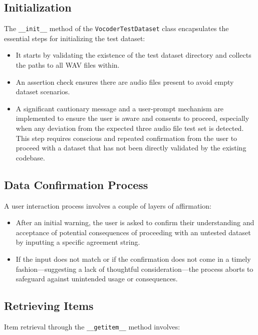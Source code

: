 \documentclass[a4paper]{article}
\begin{document}
\subsection{Initialization}

The \texttt{\_\_init\_\_} method of the \texttt{VocoderTestDataset} class encapsulates the essential steps for initializing the test dataset:

\begin{itemize}
  \item It starts by validating the existence of the test dataset directory and collects the paths to all WAV files within.
  \item An assertion check ensures there are audio files present to avoid empty dataset scenarios.
  \item A significant cautionary message and a user-prompt mechanism are implemented to ensure the user is aware and consents to proceed, especially when any deviation from the expected three audio file test set is detected. This step requires conscious and repeated confirmation from the user to proceed with a dataset that has not been directly validated by the existing codebase.
\end{itemize}

\subsection{Data Confirmation Process}

A user interaction process involves a couple of layers of affirmation:

\begin{itemize}
  \item After an initial warning, the user is asked to confirm their understanding and acceptance of potential consequences of proceeding with an untested dataset by inputting a specific agreement string.
  \item If the input does not match or if the confirmation does not come in a timely fashion—suggesting a lack of thoughtful consideration—the process aborts to safeguard against unintended usage or consequences.
\end{itemize}

\subsection{Retrieving Items}

Item retrieval through the \texttt{\_\_getitem\_\_} method involves:
\end{document}
